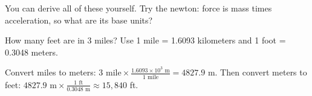 You can derive all of these yourself. Try the newton: force is mass times acceleration, so what are its base units?

\begin{Exercise}[title={Miles to Feet}, label=feet_to_miles]
How many feet are in 3 miles? Use 1 mile = 1.6093 kilometers and 1 foot = 0.3048 meters.
\end{Exercise}
\begin{Answer}[ref=feet_to_miles]
Convert miles to meters: $3 \text{ mile} \times \frac{1.6093 \times 10^{3} \text{ m}}{1 \text{ mile}} = 4827.9$ m. Then
convert meters to feet: $4827.9 \text{ m} \times \frac{1 \text{ ft}}{0.3048 \text{ m}} \approx 15{,}840$ ft.
\end{Answer}
